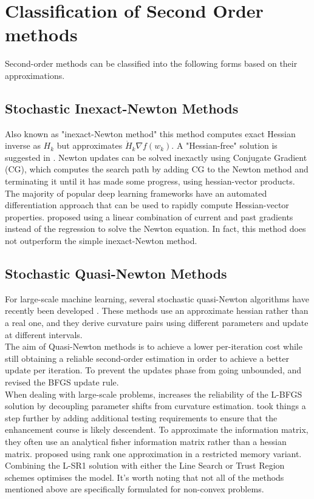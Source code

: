 \documentclass[journal]{IEEEtran}
\begin{document}
\section{Classification of Second Order methods }
Second-order methods can be classified into the following forms based on their approximations.

\subsection{Stochastic Inexact-Newton Methods}
Also known as "inexact-Newton method" this method computes exact Hessian inverse as ${H}_{k}$ but approximates $ \dot{H}_{k} \nabla f\left(w_{k}\right) $. A "Hessian-free" solution is suggested in \cite{martens2011learning}. Newton updates can be solved inexactly using Conjugate Gradient (CG), which computes the search path by adding CG to the Newton method and terminating it until it has made some progress, using hessian-vector products. \\ 
The majority of popular deep learning frameworks have an automated differentiation approach that can be used to rapidly compute Hessian-vector properties. \cite{wang2015confidence} proposed using a linear combination of current and past gradients instead of the regression to solve the Newton equation. In fact, this method does not outperform the simple inexact-Newton method.

\subsection{Stochastic Quasi-Newton Methods}
For large-scale machine learning, several stochastic quasi-Newton algorithms have recently been developed \cite{wang2017review}. These methods use an approximate hessian rather than a real one, and they derive curvature pairs using different parameters and update at different intervals. \\
The aim of Quasi-Newton methods is to achieve a lower per-iteration cost while still obtaining a reliable second-order estimation in order to achieve a better update per iteration. To prevent the updates phase from going unbounded, \cite{wang2017review} and \cite{curtis2017bfgs} revised the BFGS update rule. \\
When dealing with large-scale problems, \cite{gower2016stochastic} increases the reliability of the L-BFGS solution by decoupling parameter shifts from curvature estimation. \cite{keskar2016adaqn} took things a step further by adding additional testing requirements to ensure that the enhancement course is likely descendent. To approximate the information matrix, they often use an analytical fisher information matrix rather than a hessian matrix. \cite{ramamurthy2016sr1} proposed using rank one approximation in a restricted memory variant. Combining the L-SR1 solution with either the Line Search or Trust Region schemes optimises the model. It's worth noting that not all of the methods mentioned above are specifically formulated for non-convex problems.
\end{document}
